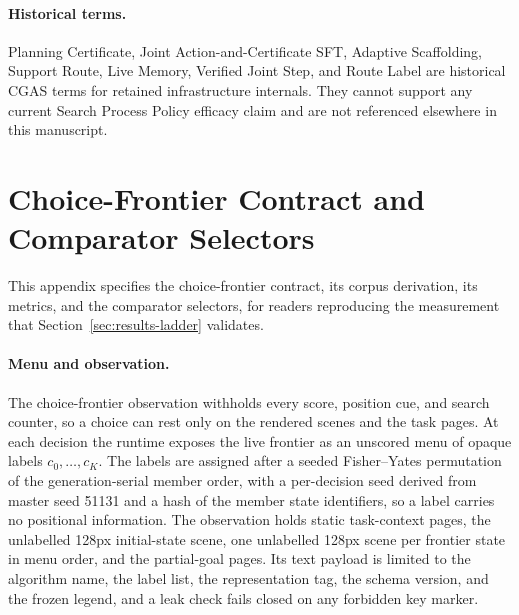 \paragraph{Historical terms.}
Planning Certificate, Joint Action-and-Certificate SFT, Adaptive Scaffolding, Support Route, Live Memory, Verified Joint Step, and Route Label are historical CGAS terms for retained infrastructure internals. They cannot support any current Search Process Policy efficacy claim and are not referenced elsewhere in this manuscript.


\section{Choice-Frontier Contract and Comparator Selectors}
\label{app:cf-contract}

This appendix specifies the choice-frontier contract, its corpus derivation, its metrics, and the comparator selectors, for readers reproducing the measurement that Section~\ref{sec:results-ladder} validates.

\paragraph{Menu and observation.}
The choice-frontier observation withholds every score, position cue, and search counter, so a choice can rest only on the rendered scenes and the task pages. At each decision the runtime exposes the live frontier as an unscored menu of opaque labels $c_0, \ldots, c_K$. The labels are assigned after a seeded Fisher--Yates permutation of the generation-serial member order, with a per-decision seed derived from master seed 51131 and a hash of the member state identifiers, so a label carries no positional information. The observation holds static task-context pages, the unlabelled 128px initial-state scene, one unlabelled 128px scene per frontier state in menu order, and the partial-goal pages. Its text payload is limited to the algorithm name, the label list, the representation tag, the schema version, and the frozen legend, and a leak check fails closed on any forbidden key marker.

